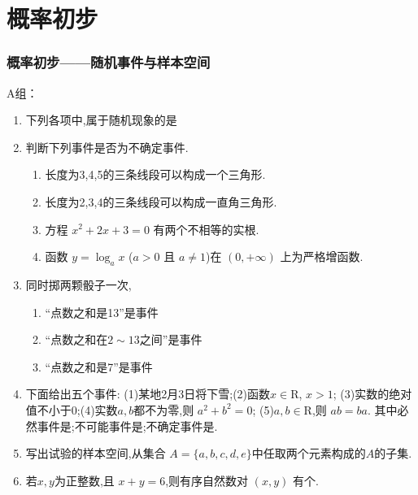 \chapter*{概率初步}

\subsection*{概率初步——随机事件与样本空间}

A组：
\begin{enumerate}


\item 下列各项中,属于随机现象的是

\item 判断下列事件是否为不确定事件.
\begin{enumerate}
\item 长度为3,4,5的三条线段可以构成一个三角形. 
\item 长度为2,3,4的三条线段可以构成一直角三角形.
\item 方程 $x^{2}+2x+3=0$ 有两个不相等的实根.
\item 函数 $y=\log_{a}x$ ($a>0$ 且 $a\ne1$)在 $(0,+\infty)$ 上为严格增函数.
\end{enumerate}

\item 同时掷两颗骰子一次,

\begin{enumerate}

\item “点数之和是13”是事件
\item “点数之和在$2\sim13$之间”是事件
\item “点数之和是7”是事件

\end{enumerate}

\item 下面给出五个事件: 
(1)某地2月3日将下雪;(2)函数$x\in\text{R}$, $x>1$; (3)实数的绝对值不小于0;(4)实数$a,b$都不为零,则 $a^{2}+b^{2}=0$; (5)$a, b\in\text{R}$,则 $ab=ba$. 
其中必然事件是;不可能事件是;不确定事件是.

\item 写出试验的样本空间,从集合 $A=\{a,b, c, d, e\}$中任取两个元素构成的$A$的子集.

\item 若$x,y$为正整数,且 $x+y=6$,则有序自然数对 $(x,y)$ 有个.
\end{enumerate}


